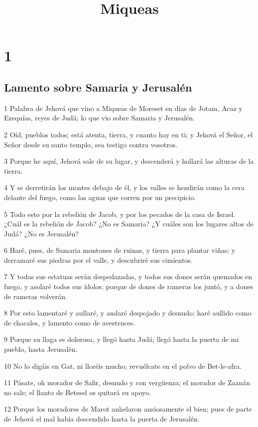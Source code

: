 

\title{Miqueas}

\chapter{1}

\section*{Lamento sobre Samaria y Jerusalén}

\par 1 Palabra de Jehová que vino a Miqueas de Moreset en días de Jotam, Acaz y Ezequías, reyes de Judá; lo que vio sobre Samaria y Jerusalén.
\par 2 Oíd, pueblos todos; está atenta, tierra, y cuanto hay en ti; y Jehová el Señor, el Señor desde su santo templo, sea testigo contra vosotros.
\par 3 Porque he aquí, Jehová sale de su lugar, y descenderá y hollará las alturas de la tierra.
\par 4 Y se derretirán los montes debajo de él, y los valles se hendirán como la cera delante del fuego, como las aguas que corren por un precipicio.
\par 5 Todo esto por la rebelión de Jacob, y por los pecados de la casa de Israel. ¿Cuál es la rebelión de Jacob? ¿No es Samaria? ¿Y cuáles son los lugares altos de Judá? ¿No es Jerusalén?
\par 6 Haré, pues, de Samaria montones de ruinas, y tierra para plantar viñas; y derramaré sus piedras por el valle, y descubriré sus cimientos.
\par 7 Y todas sus estatuas serán despedazadas, y todos sus dones serán quemados en fuego, y asolaré todos sus ídolos; porque de dones de rameras los juntó, y a dones de rameras volverán.
\par 8 Por esto lamentaré y aullaré, y andaré despojado y desnudo; haré aullido como de chacales, y lamento como de avestruces.
\par 9 Porque su llaga es dolorosa, y llegó hasta Judá; llegó hasta la puerta de mi pueblo, hasta Jerusalén.
\par 10 No lo digáis en Gat, ni lloréis mucho; revuélcate en el polvo de Bet-le-afra.
\par 11 Pásate, oh morador de Safir, desnudo y con vergüenza; el morador de Zaanán no sale; el llanto de Betesel os quitará su apoyo.
\par 12 Porque los moradores de Marot anhelaron ansiosamente el bien; pues de parte de Jehová el mal había descendido hasta la puerta de Jerusalén.
